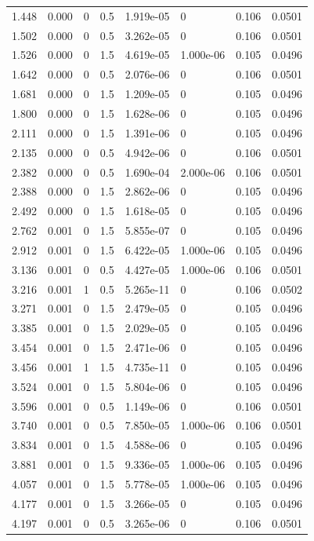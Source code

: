 \documentclass[preview]{standalone}
\begin{document}
{{\begin{tabular}{L{1.2cm}C{1.2cm} C{0.3cm}C{0.5cm} C{1.4cm}C{1.4cm} C{1.4cm}C{1.4cm}}
  1.448  &  0.000  & 0     & 0.5 &  1.919e-05  & 0  & 0.106 &  0.0501   \\ 
  1.502  &  0.000  & 0     & 0.5 &  3.262e-05  & 0  & 0.106 &  0.0501   \\ 
  1.526  &  0.000  & 0     & 1.5 &  4.619e-05  & 1.000e-06  & 0.105 &  0.0496   \\ 
  1.642  &  0.000  & 0     & 0.5 &  2.076e-06  & 0  & 0.106 &  0.0501   \\ 
  1.681  &  0.000  & 0     & 1.5 &  1.209e-05  & 0  & 0.105 &  0.0496   \\ 
  1.800  &  0.000  & 0     & 1.5 &  1.628e-06  & 0  & 0.105 &  0.0496   \\ 
  2.111  &  0.000  & 0     & 1.5 &  1.391e-06  & 0  & 0.105 &  0.0496   \\ 
  2.135  &  0.000  & 0     & 0.5 &  4.942e-06  & 0  & 0.106 &  0.0501   \\ 
  2.382  &  0.000  & 0     & 0.5 &  1.690e-04  & 2.000e-06  & 0.106 &  0.0501   \\ 
  2.388  &  0.000  & 0     & 1.5 &  2.862e-06  & 0  & 0.105 &  0.0496   \\ 
  2.492  &  0.000  & 0     & 1.5 &  1.618e-05  & 0  & 0.105 &  0.0496   \\ 
  2.762  &  0.001  & 0     & 1.5 &  5.855e-07  & 0  & 0.105 &  0.0496   \\ 
  2.912  &  0.001  & 0     & 1.5 &  6.422e-05  & 1.000e-06  & 0.105 &  0.0496   \\ 
  3.136  &  0.001  & 0     & 0.5 &  4.427e-05  & 1.000e-06  & 0.106 &  0.0501   \\ 
  3.216  &  0.001  & 1     & 0.5 &  5.265e-11  & 0  & 0.106 &  0.0502   \\ 
  3.271  &  0.001  & 0     & 1.5 &  2.479e-05  & 0  & 0.105 &  0.0496   \\ 
  3.385  &  0.001  & 0     & 1.5 &  2.029e-05  & 0  & 0.105 &  0.0496   \\ 
  3.454  &  0.001  & 0     & 1.5 &  2.471e-06  & 0  & 0.105 &  0.0496   \\ 
  3.456  &  0.001  & 1     & 1.5 &  4.735e-11  & 0  & 0.105 &  0.0496   \\ 
  3.524  &  0.001  & 0     & 1.5 &  5.804e-06  & 0  & 0.105 &  0.0496   \\ 
  3.596  &  0.001  & 0     & 0.5 &  1.149e-06  & 0  & 0.106 &  0.0501   \\ 
  3.740  &  0.001  & 0     & 0.5 &  7.850e-05  & 1.000e-06  & 0.106 &  0.0501   \\ 
  3.834  &  0.001  & 0     & 1.5 &  4.588e-06  & 0  & 0.105 &  0.0496   \\ 
  3.881  &  0.001  & 0     & 1.5 &  9.336e-05  & 1.000e-06  & 0.105 &  0.0496   \\ 
  4.057  &  0.001  & 0     & 1.5 &  5.778e-05  & 1.000e-06  & 0.105 &  0.0496   \\ 
  4.177  &  0.001  & 0     & 1.5 &  3.266e-05  & 0  & 0.105 &  0.0496   \\ 
  4.197  &  0.001  & 0     & 0.5 &  3.265e-06  & 0  & 0.106 &  0.0501   \\ 
\hline 
\end{tabular} 

}}
\end{document}
